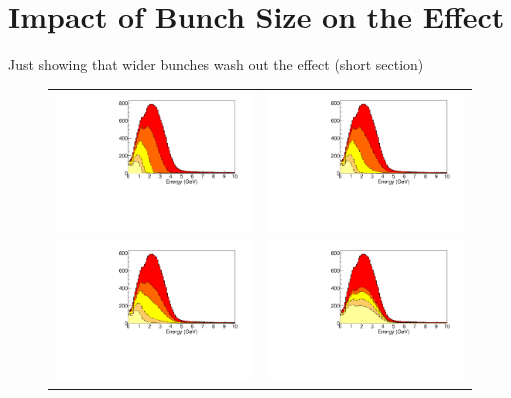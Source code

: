 \documentclass[preprint,12pt]{elsarticle}
\begin{document}
\section{Impact of Bunch Size on the Effect}

Just showing that wider bunches wash out the effect (short section)

\begin{figure}[t]
	\begin{center}
           	\begin{tabular}{c c}	
           	\includegraphics[width=0.49 \linewidth]{Figures/2018.10.10_LBNFtiming/DUNEbeam_truetimingB.pdf} &
			\includegraphics[width=0.49 \linewidth]{Figures/2018.10.10_LBNFtiming/DUNEbeam_100psecB.pdf} \\
           	\includegraphics[width=0.49 \linewidth]{Figures/2018.10.10_LBNFtiming/DUNEbeam_250psecB.pdf} &
			\includegraphics[width=0.49 \linewidth]{Figures/2018.10.10_LBNFtiming/DUNEbeam_900psecB.pdf}

\end{tabular}
\end{center}
\end{figure}
\end{document}
